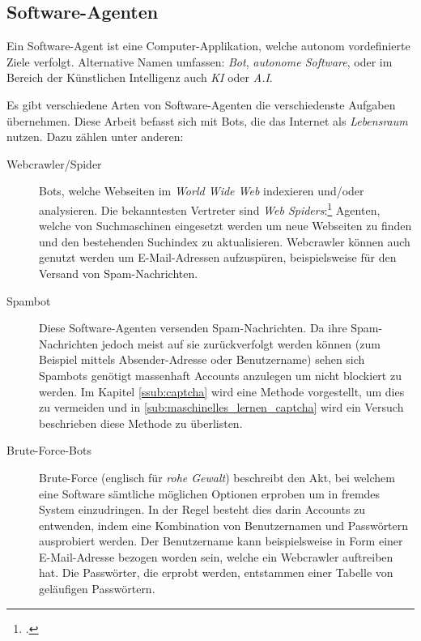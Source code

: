 \subsection{Software-Agenten} %
\label{sub:software_agenten}
Ein Software-Agent ist eine Computer-Applikation, welche autonom vordefinierte
Ziele verfolgt. Alternative Namen umfassen: \emph{Bot}, \emph{autonome
Software}, oder im Bereich der Künstlichen Intelligenz auch \emph{KI} oder
\emph{A.I}.

Es gibt verschiedene Arten von Software-Agenten die verschiedenste Aufgaben
übernehmen. Diese Arbeit befasst sich mit Bots, die das Internet als
\emph{Lebensraum} nutzen. Dazu zählen unter anderen:

\begin{description}
  \item[Webcrawler/Spider]
  Bots, welche Webseiten im \emph{World Wide Web} indexieren und/oder
  analysieren. Die bekanntesten Vertreter sind \emph{Web
  Spiders}:\footcite{wa:tkWWWRobot} Agenten, welche von Suchmaschinen eingesetzt
  werden um neue Webseiten zu finden und den bestehenden Suchindex zu
  aktualisieren. Webcrawler können auch genutzt werden um E-Mail-Adressen
  aufzuspüren, beispielsweise für den Versand von Spam-Nachrichten.
  
  \item[Spambot]
  Diese Software-Agenten versenden Spam-Nachrichten. Da ihre Spam-Nachrichten
  jedoch meist auf sie zurückverfolgt werden können (zum Beispiel mittels
  Absender-Adresse oder Benutzername) sehen sich Spambots genötigt massenhaft
  Accounts anzulegen um nicht blockiert zu werden. Im Kapitel
  \ref{ssub:captcha} wird eine Methode vorgestellt, um dies zu vermeiden und in
  \ref{sub:maschinelles_lernen_captcha} wird ein Versuch beschrieben diese
  Methode zu überlisten.
  
  \item[Brute-Force-Bots]
  Brute-Force (englisch für \emph{rohe Gewalt}) beschreibt den Akt, bei welchem
  eine Software sämtliche möglichen Optionen erproben um in fremdes System
  einzudringen. In der Regel besteht dies darin Accounts zu entwenden, indem
  eine Kombination von Benutzernamen und Passwörtern ausprobiert werden. Der
  Benutzername kann beispielsweise in Form einer E-Mail-Adresse bezogen worden
  sein, welche ein Webcrawler auftreiben hat. Die Passwörter, die erprobt
  werden, entstammen einer Tabelle von geläufigen Passwörtern.
\end{description}
